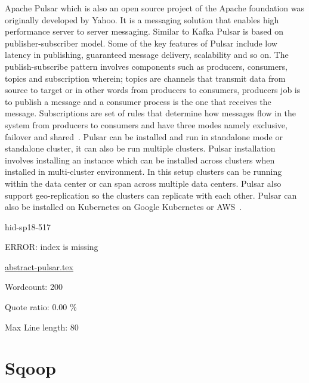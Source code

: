 Apache Pulsar which is also an open source project of the Apache foundation was
originally developed by Yahoo. It is a messaging solution that enables high
performance server to server messaging.  Similar to Kafka Pulsar is based on
publisher-subscriber model.  Some of the key features of Pulsar include low
latency in publishing, guaranteed message delivery, scalability and so on.  The
publish-subscribe pattern involves components such as producers, consumers,
topics and subscription wherein; topics are channels that transmit data from
source to target or in other words from producers to consumers, producers job is
to publish a message and a consumer process is the one that receives the
message.  Subscriptions are set of rules that determine how messages flow in the
system from producers to consumers and have three modes namely exclusive,
failover and shared~\cite{hid-sp18-517-pulsar-apache}.  Pulsar can be installed
and run in standalone mode or standalone cluster, it can also be run multiple
clusters. Pulsar installation involves installing an instance which can be
installed across clusters when installed in multi-cluster environment. In this
setup clusters can be running within the data center or can span across multiple
data centers.  Pulsar also support geo-replication so the clusters can replicate
with each other. Pulsar can also be installed on Kubernetes on Google Kubernetes
or AWS~\cite{hid-sp18-517-pulsar-apache}.


\begin{IU}

hid-sp18-517

ERROR: index is missing

\href{https://github.com/cloudmesh-community/hid-sp18-517/blob/master//technology/abstract-pulsar.tex}{abstract-pulsar.tex}

 

Wordcount: 200


Quote ratio: 0.00 \%
 
Max Line length: 80
\end{IU}

\section{Sqoop}

